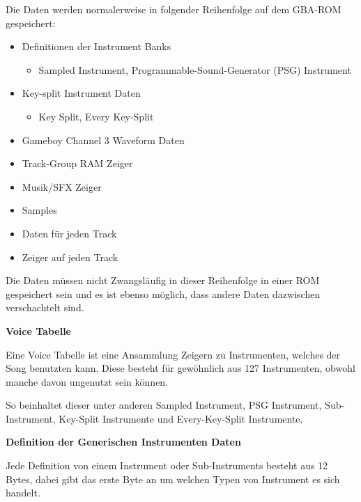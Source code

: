 \documentclass[11pt,a4paper]{scrartcl}
\newcommand{\paratitle}[1] {
    \vspace{5mm}
    \large \textbf{#1} \normalsize
    \vspace{2mm}\newline
}
\begin{document}
Die Daten werden normalerweise in folgender Reihenfolge auf dem GBA-ROM gespeichert:
\vspace{15pt}
\begin{itemize}
\item Definitionen der Instrument Banks
\begin{itemize}
\item Sampled Instrument, Programmable-Sound-Generator (PSG) Instrument
\end{itemize}
\item Key-split Instrument Daten
\begin{itemize}
\item Key Split, Every Key-Split
\end{itemize}
\item Gameboy Channel 3 Waveform Daten
\item Track-Group RAM Zeiger
\item Musik/SFX Zeiger
\item Samples
\item Daten f\"ur jeden Track
\item Zeiger auf jeden Track
\end{itemize}
\vspace{15pt}

Die Daten m\"ussen nicht Zwangsl\"aufig in dieser Reihenfolge in einer ROM gespeichert sein und es ist ebenso m\"oglich, dass andere Daten dazwischen verschachtelt sind.

\vspace{15pt}
\textbf{{\large Voice Tabelle}}

Eine Voice Tabelle ist eine Ansammlung Zeigern zu Instrumenten, welches der Song benutzten kann. Diese besteht f\"ur gew\"ohnlich aus 127 Instrumenten, obwohl manche davon ungenutzt sein k\"onnen. 

So beinhaltet dieser unter anderen Sampled Instrument, PSG Instrument, Sub-Instrument, Key-Split Instrumente und Every-Key-Split Instrumente.

\newpage
\paratitle{Definition der Generischen Instrumenten Daten}
Jede Definition von einem Instrument oder Sub-Instruments besteht aus 12 Bytes, dabei gibt das erste Byte an um welchen Typen von Instrument es sich handelt.
\end{document}
